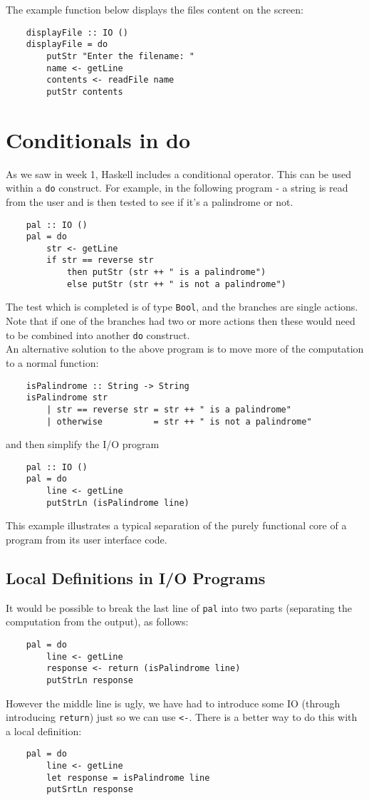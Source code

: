 The example function below displays the files content on the screen:
\begin{verbatim}
    displayFile :: IO ()
    displayFile = do
        putStr "Enter the filename: "
        name <- getLine
        contents <- readFile name
        putStr contents
\end{verbatim}

\section{Conditionals in do}
As we saw in week 1, Haskell includes a conditional operator. This can be used within a \verb|do| construct. For example, in the following program - a string is read from the user and is then tested to see if it's a palindrome or not.
\begin{verbatim}
    pal :: IO ()
    pal = do
        str <- getLine
        if str == reverse str
            then putStr (str ++ " is a palindrome")
            else putStr (str ++ " is not a palindrome")
\end{verbatim}
The test which is completed is of type \verb|Bool|, and the branches are single actions. Note that if one of the branches had two or more actions then these would need to be combined into another \verb|do| construct.\\

An alternative solution to the above program is to move more of the computation to a normal function:
\begin{verbatim}
    isPalindrome :: String -> String
    isPalindrome str
        | str == reverse str = str ++ " is a palindrome"
        | otherwise          = str ++ " is not a palindrome"
\end{verbatim}
and then simplify the I/O program
\begin{verbatim}
    pal :: IO ()
    pal = do
        line <- getLine
        putStrLn (isPalindrome line)
\end{verbatim}
This example illustrates a typical separation of the purely functional core of a program from its user interface code.

\subsection{Local Definitions in I/O Programs}
It would be possible to break the last line of \verb|pal| into two parts (separating the computation from the output), as follows:
\begin{verbatim}
    pal = do
        line <- getLine
        response <- return (isPalindrome line)
        putStrLn response
\end{verbatim}
However the middle line is ugly, we have had to introduce some IO (through introducing \verb|return|) just so we can use \verb|<-|. There is a better way to do this with a local definition:
\begin{verbatim}
    pal = do
        line <- getLine
        let response = isPalindrome line
        putSrtLn response
\end{verbatim}

